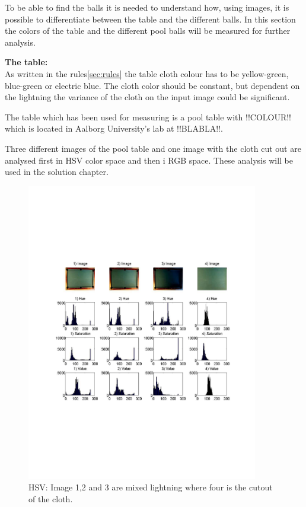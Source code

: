 To be able to find the balls it is needed to understand how, using images, it is possible to differentiate between the table and the different balls. In this section the colors of the table and the different pool balls will be measured for further analysis.	

\textbf{The table:}\\
As written in the rules\ref{sec:rules} the table cloth colour has to be yellow-green, blue-green or electric blue. The cloth color should be constant, but dependent on the lightning the variance of the cloth on the input image could be significant.

The table which has been used for measuring is a pool table with !!COLOUR!! which is located in Aalborg University's lab at !!BLABLA!!. 

Three different images of the pool table and one image with the cloth cut out are analysed first in HSV color space and then i RGB space. These analysis will be used in the solution chapter.

\begin{figure}[H]
\begin{center}
\leavevmode
\includegraphics[width=0.9\textwidth]{images/table_hist_hsv.pdf}
\end{center}
\caption{HSV: Image 1,2 and 3 are mixed lightning where four is the cutout of the cloth.}
\label{fig:tablehsv}
\end{figure}

